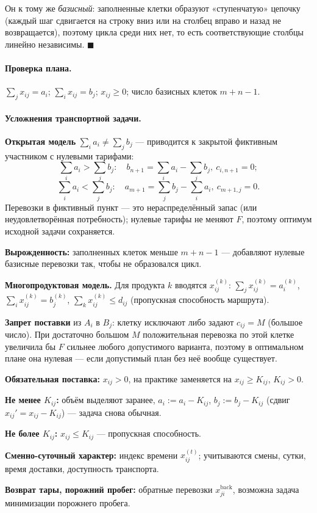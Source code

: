 Он к тому же \emph{базисный}: заполненные клетки образуют «ступенчатую»
цепочку (каждый шаг сдвигается на строку вниз или на столбец вправо и назад
не возвращается), поэтому цикла среди них нет, то есть соответствующие столбцы
линейно независимы. $\blacksquare$

\paragraph{Проверка плана.}
$\sum_j x_{ij} = a_i$; $\sum_i x_{ij} = b_j$; $x_{ij} \ge 0$; число базисных
клеток $m+n-1$.

\paragraph{Усложнения транспортной задачи.}
\begin{csteps}
  \item \textbf{Открытая модель} $\sum_i a_i \ne \sum_j b_j$ — приводится к
        закрытой фиктивным участником с нулевыми тарифами:
        \[
          \sum_i a_i > \sum_j b_j :\quad
            b_{n+1} = \sum_i a_i - \sum_j b_j ,\ c_{i,n+1} = 0 ;
        \]
        \[
          \sum_i a_i < \sum_j b_j :\quad
            a_{m+1} = \sum_j b_j - \sum_i a_i ,\ c_{m+1,j} = 0 .
        \]
        Перевозки в фиктивный пункт — это нераспределённый запас (или
        неудовлетворённая потребность); нулевые тарифы не меняют $F$, поэтому
        оптимум исходной задачи сохраняется.
  \item \textbf{Вырожденность:} заполненных клеток меньше $m+n-1$ — добавляют
        нулевые базисные перевозки так, чтобы не образовался цикл.
  \item \textbf{Многопродуктовая модель.} Для продукта $k$ вводятся
        $x_{ij}^{(k)}$:
        $\sum_j x_{ij}^{(k)} = a_i^{(k)}$,
        $\sum_i x_{ij}^{(k)} = b_j^{(k)}$,
        $\sum_k x_{ij}^{(k)} \le d_{ij}$ (пропускная способность маршрута).
  \item \textbf{Запрет поставки} из $A_i$ в $B_j$: клетку исключают либо
        задают $c_{ij} = M$ (большое число). При достаточно большом $M$
        положительная перевозка по этой клетке увеличила бы $F$ сильнее любого
        допустимого варианта, поэтому в оптимальном плане она нулевая — если
        допустимый план без неё вообще существует.
  \item \textbf{Обязательная поставка:} $x_{ij} > 0$, на практике заменяется
        на $x_{ij} \ge K_{ij}$, $K_{ij} > 0$.
  \item \textbf{Не менее $K_{ij}$:} объём выделяют заранее,
        $a_i := a_i - K_{ij}$, $b_j := b_j - K_{ij}$ (сдвиг
        $x_{ij}' = x_{ij} - K_{ij}$) — задача снова обычная.
  \item \textbf{Не более $K_{ij}$:} $x_{ij} \le K_{ij}$ — пропускная
        способность.
  \item \textbf{Сменно-суточный характер:} индекс времени $x_{ij}^{(t)}$;
        учитываются смены, сутки, время доставки, доступность транспорта.
  \item \textbf{Возврат тары, порожний пробег:} обратные перевозки
        $x_{ji}^{\text{back}}$, возможна задача минимизации порожнего пробега.
\end{csteps}

